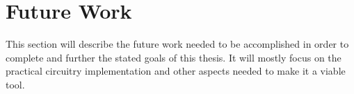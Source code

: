 \section {Future Work}

This section will describe the future work needed to be accomplished in order to complete and further the stated goals of this thesis. It will mostly focus on the practical circuitry implementation and other aspects needed to make it a viable tool.
